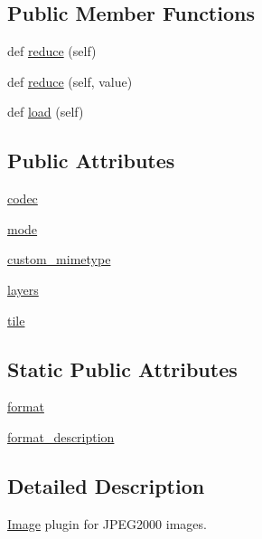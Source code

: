 \subsection*{Public Member Functions}
\begin{DoxyCompactItemize}
\item 
def \hyperlink{classPIL_1_1Jpeg2KImagePlugin_1_1Jpeg2KImageFile_a9a6650c4e273746a8949cb8556f6cd0a}{reduce} (self)
\item 
def \hyperlink{classPIL_1_1Jpeg2KImagePlugin_1_1Jpeg2KImageFile_a9b9df0425760ac58d8831e9658bf0655}{reduce} (self, value)
\item 
def \hyperlink{classPIL_1_1Jpeg2KImagePlugin_1_1Jpeg2KImageFile_a75c4d56d67bfeab8353911e828b71d1f}{load} (self)
\end{DoxyCompactItemize}
\subsection*{Public Attributes}
\begin{DoxyCompactItemize}
\item 
\hyperlink{classPIL_1_1Jpeg2KImagePlugin_1_1Jpeg2KImageFile_a3c7d778bb37e566d1b7d16bdc088a785}{codec}
\item 
\hyperlink{classPIL_1_1Jpeg2KImagePlugin_1_1Jpeg2KImageFile_afe00eae48ff7dd5dd133f1fea2331f90}{mode}
\item 
\hyperlink{classPIL_1_1Jpeg2KImagePlugin_1_1Jpeg2KImageFile_acf09b485a9fa56a3cab152b6a706743e}{custom\+\_\+mimetype}
\item 
\hyperlink{classPIL_1_1Jpeg2KImagePlugin_1_1Jpeg2KImageFile_ad7d6a4dfdceb4f4b9db59bfa0947f1e4}{layers}
\item 
\hyperlink{classPIL_1_1Jpeg2KImagePlugin_1_1Jpeg2KImageFile_aa4057e80e30f5605b7d0795d03cd05d0}{tile}
\end{DoxyCompactItemize}
\subsection*{Static Public Attributes}
\begin{DoxyCompactItemize}
\item 
\hyperlink{classPIL_1_1Jpeg2KImagePlugin_1_1Jpeg2KImageFile_aed3963509942b35649eb7ddc9d07f84b}{format}
\item 
\hyperlink{classPIL_1_1Jpeg2KImagePlugin_1_1Jpeg2KImageFile_a09cc2b58f931a841242898c62d1059ff}{format\+\_\+description}
\end{DoxyCompactItemize}


\subsection{Detailed Description}
\hyperlink{namespacePIL_1_1Image}{Image} plugin for J\+P\+E\+G2000 images. 




